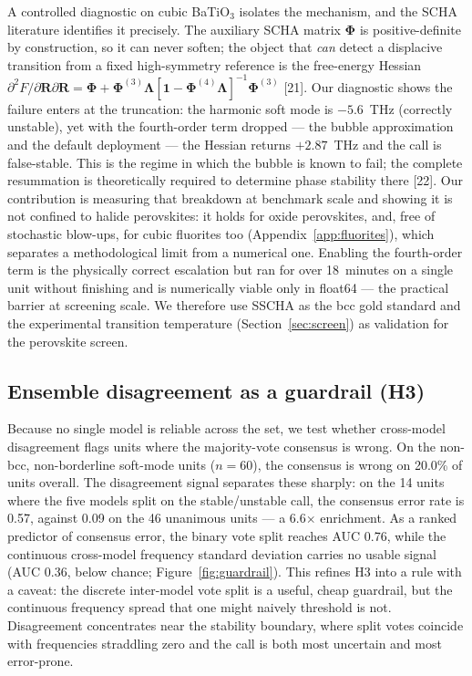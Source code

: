 \documentclass{article}
\begin{document}
A controlled diagnostic on cubic BaTiO$_3$ isolates the mechanism, and the SCHA literature identifies it precisely. The auxiliary SCHA matrix $\boldsymbol{\Phi}$ is positive-definite by construction, so it can never soften; the object that \emph{can} detect a displacive transition from a fixed high-symmetry reference is the free-energy Hessian $\partial^2F/\partial\mathbf{R}\partial\mathbf{R}=\boldsymbol{\Phi}+\boldsymbol{\Phi}^{(3)}\boldsymbol{\Lambda}[\mathbf{1}-\boldsymbol{\Phi}^{(4)}\boldsymbol{\Lambda}]^{-1}\boldsymbol{\Phi}^{(3)}$ [21]. Our diagnostic shows the failure enters at the truncation: the harmonic soft mode is $-5.6$~THz (correctly unstable), yet with the fourth-order term dropped --- the bubble approximation and the default deployment --- the Hessian returns $+2.87$~THz and the call is false-stable. This is the regime in which the bubble is known to fail; the complete resummation is theoretically required to determine phase stability there [22]. Our contribution is measuring that breakdown at benchmark scale and showing it is not confined to halide perovskites: it holds for oxide perovskites, and, free of stochastic blow-ups, for cubic fluorites too (Appendix~\ref{app:fluorites}), which separates a methodological limit from a numerical one. Enabling the fourth-order term is the physically correct escalation but ran for over 18~minutes on a single unit without finishing and is numerically viable only in float64 --- the practical barrier at screening scale. We therefore use SSCHA as the bcc gold standard and the experimental transition temperature (Section~\ref{sec:screen}) as validation for the perovskite screen.

\subsection{Ensemble disagreement as a guardrail (H3)}
\label{sec:h3}

Because no single model is reliable across the set, we test whether cross-model disagreement flags units where the majority-vote consensus is wrong. On the non-bcc, non-borderline soft-mode units ($n=60$), the consensus is wrong on 20.0\% of units overall. The disagreement signal separates these sharply: on the 14 units where the five models split on the stable/unstable call, the consensus error rate is 0.57, against 0.09 on the 46 unanimous units --- a 6.6$\times$ enrichment. As a ranked predictor of consensus error, the binary vote split reaches AUC 0.76, while the continuous cross-model frequency standard deviation carries no usable signal (AUC 0.36, below chance; Figure~\ref{fig:guardrail}). This refines H3 into a rule with a caveat: the discrete inter-model vote split is a useful, cheap guardrail, but the continuous frequency spread that one might naively threshold is not. Disagreement concentrates near the stability boundary, where split votes coincide with frequencies straddling zero and the call is both most uncertain and most error-prone.
\end{document}
